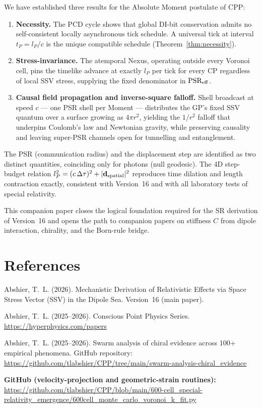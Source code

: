 \documentclass[12pt]{article}
\begin{document}
We have established three results for the Absolute Moment postulate of CPP:

\begin{enumerate}
  \item \textbf{Necessity.}  The PCD cycle shows that global DI-bit
    conservation admits no self-consistent locally asynchronous tick
    schedule.  A universal tick at interval $t_P = l_P/c$ is the unique
    compatible schedule (Theorem~\ref{thm:necessity}).

  \item \textbf{Stress-invariance.}  The atemporal Nexus, operating outside
    every Voronoi cell, pins the timelike advance at exactly $l_P$ per tick
    for every CP regardless of local SSV stress, supplying the fixed
    denominator in $\text{PSR}_{\rm eff}$.

  \item \textbf{Causal field propagation and inverse-square falloff.}  Shell
    broadcast at speed $c$ --- one PSR shell per Moment --- distributes the
    GP's fixed SSV quantum over a surface growing as $4\pi r^2$, yielding the
    $1/r^2$ falloff that underpins Coulomb's law and Newtonian gravity,
    while preserving causality and leaving super-PSR channels open for
    tunnelling and entanglement.
\end{enumerate}

The PSR (communication radius) and the displacement step are identified as
two distinct quantities, coinciding only for photons (null geodesic).  The
4D step-budget relation $l_P^2 = (c\,\Delta\tau)^2 + |\mathbf{d}_{\rm
spatial}|^2$ reproduces time dilation and length contraction exactly,
consistent with Version~16 and with all laboratory tests of special
relativity.

This companion paper closes the logical foundation required for the SR
derivation of Version~16 and opens the path to companion papers on stiffness
$C$ from dipole interaction, chirality, and the Born-rule bridge.

\section*{References}

\begin{enumerate}[label={[\arabic*]}]
  \item Abshier, T.~L. (2026).
    Mechanistic Derivation of Relativistic Effects via Space Stress Vector
    (SSV) in the Dipole Sea.  Version~16 (main paper).

  \item Abshier, T.~L. (2025--2026).
    Conscious Point Physics Series.
    \url{https://hyperphysics.com/papers}

  \item Abshier, T.~L. (2025--2026).
    Swarm analysis of chiral evidence across 100+ empirical phenomena.
    GitHub repository:
    \url{https://github.com/tlabshier/CPP/tree/main/swarm-analysis-chiral_evidence}
\end{enumerate}

\bigskip
\noindent\textbf{GitHub (velocity-projection and geometric-strain routines):}\\
\url{https://github.com/tlabshier/CPP/blob/main/600-cell_special-relativity_emergence/600cell_monte_carlo_voronoi_k_fit.py}
\end{document}

